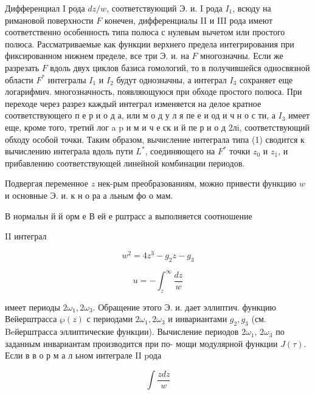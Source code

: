 \documentclass[10pt]{article}
\begin{document}
Дифференциал I рода $d z / w$, соответствующий Э. и. I рода $I_{1}$, всюду на римановой поверхности $F$ конечен, дифференциалы II и III рода имеют соответственно особенность типа полюса с нулевым вычетом или простого полюса. Рассматриваемые как функции верхнего предела интегрирования при фиксированном нижнем пределе, все три Э. и. на $F$ многозначны. Если же разрезать $F$ вдоль двух циклов базиса гомологий, то в получившейся односвязной области $F^{*}$ интегралы $I_{1}$ и $I_{2}$ будут однозначны, а интеграл $I_{3}$ сохраняет еще логарифмич. многозначность, появляющуюся при обходе простого полюса. При переходе через разрез каждый интеграл изменяется на делое кратное соответствующего п е р и о д а, или м о д у л я пе е и од и ч н о с ти, а $I_{3}$ имеет еще, кроме того, третий лог a p и м и ч е ск и й пе р и о д 2лi, соответствующий обходу особой точки. Таким образом, вычисление интеграла типа (1) сводится к вычислению интеграла вдоль пути $L^{*}$, соединяющего на $F^{*}$ точки $z_{0}$ и $z_{1}$, и прибавлению соответствующей линейной комбинации периодов.



Подвергая переменное $z$ нек-рым преобразованиям, можно привести функцию $w$ и основные Э. и. к н о ра а льным фо о мам.



В нормальн й й орм е В ей е рштрасс а выполняется соотношение



II интеграл



\[

w^{2}=4 z^{3}-g_{2} z-g_{3}

\]



\[

u=-\int_{z}^{\infty} \frac{d z}{w}

\]



имеет периоды $2 \omega_{1}, 2 \omega_{3}$. Обращение этого Э. и. дает эллиптич. функцию Вейерштрасса $\wp(z)$ с периодами $2 \omega_{1}, 2 \omega_{3}$ и инвариантами $g_{2}, g_{3}$ (см. Beйерштрасса эллиптические функции). Вычисление периодов $2 \omega_{1}$, $2 \omega_{3}$ по заданным инвариантам производится при по- мощи модулярной функции $J(\tau)$. Если в в о р м а л ьном интеграле II pода



\[

\int \frac{z d z}{w}

\]
\end{document}
